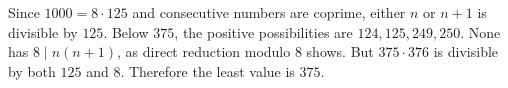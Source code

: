 Since $1000=8\cdot125$ and consecutive numbers are coprime, either $n$ or $n+1$ is divisible by $125$. Below $375$, the positive possibilities are $124,125,249,250$. None has $8\mid n(n+1)$, as direct reduction modulo $8$ shows. But $375\cdot376$ is divisible by both $125$ and $8$. Therefore the least value is $\boxed{375}$.
